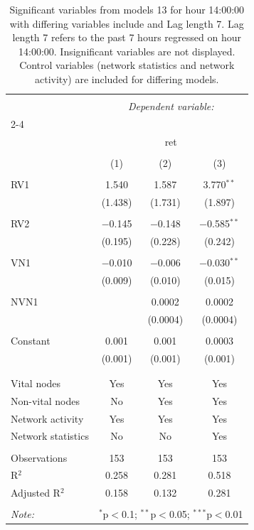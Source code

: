 
\begin{table}[!htbp] \centering 
  \caption{Significant variables from models 13 for hour 14:00:00 with differing variables include 
                               and Lag length 7. Lag length 7 refers to the past 7 hours regressed on hour 14:00:00. 
                               Insignificant variables are not displayed. 
                               Control variables (network statistics and network activity) are 
                               included for differing models.} 
  \label{RVmodels2_t_hourlagged1} 
\scriptsize 
\begin{tabular}{@{\extracolsep{5pt}}lccc} 
\\[-1.8ex]\hline 
\hline \\[-1.8ex] 
 & \multicolumn{3}{c}{\textit{Dependent variable:}} \\ 
\cline{2-4} 
\\[-1.8ex] & \multicolumn{3}{c}{ret} \\ 
\\[-1.8ex] & (1) & (2) & (3)\\ 
\hline \\[-1.8ex] 
 RV1 & 1.540 & 1.587 & 3.770$^{**}$ \\ 
  & (1.438) & (1.731) & (1.897) \\ 
  & & & \\ 
 RV2 & $-$0.145 & $-$0.148 & $-$0.585$^{**}$ \\ 
  & (0.195) & (0.228) & (0.242) \\ 
  & & & \\ 
 VN1 & $-$0.010 & $-$0.006 & $-$0.030$^{**}$ \\ 
  & (0.009) & (0.010) & (0.015) \\ 
  & & & \\ 
 NVN1 &  & 0.0002 & 0.0002 \\ 
  &  & (0.0004) & (0.0004) \\ 
  & & & \\ 
 Constant & 0.001 & 0.001 & 0.0003 \\ 
  & (0.001) & (0.001) & (0.001) \\ 
  & & & \\ 
\hline \\[-1.8ex] 
Vital nodes & Yes & Yes & Yes \\ 
Non-vital nodes & No & Yes & Yes \\ 
Network activity & Yes & Yes & Yes \\ 
Network statistics & No & No & Yes \\ 
\hline &  &  &  \\ 
Observations & 153 & 153 & 153 \\ 
R$^{2}$ & 0.258 & 0.281 & 0.518 \\ 
Adjusted R$^{2}$ & 0.158 & 0.132 & 0.281 \\ 
\hline 
\hline \\[-1.8ex] 
\textit{Note:}  & \multicolumn{3}{r}{$^{*}$p$<$0.1; $^{**}$p$<$0.05; $^{***}$p$<$0.01} \\ 
\end{tabular} 
\end{table} 
